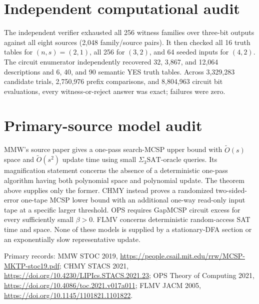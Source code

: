 \documentclass[11pt]{article}
\begin{document}
\section{Independent computational audit}
The independent verifier exhausted all 256 witness families over three-bit
outputs against all eight sources (2,048 family/source pairs).  It then checked
all 16 truth tables for $(n,s)=(2,1)$, all 256 for $(3,2)$, and 64 seeded inputs
for $(4,2)$.  The circuit enumerator independently recovered 32, 3,867, and
12,064 descriptions and 6, 40, and 90 semantic YES truth tables.  Across
3,329,283 candidate trials, 2,750,976 prefix comparisons, and 8,804,963 circuit
bit evaluations, every witness-or-reject answer was exact; failures were zero.

\section{Primary-source model audit}
MMW's source paper gives a one-pass search-MCSP upper bound with
$\widetilde O(s)$ space and $\widetilde O(s^2)$ update time using small
$\Sigma_3\mathrm{SAT}$-oracle queries.  Its magnification statement concerns
the absence of a deterministic one-pass algorithm having both polynomial
space and polynomial update.  The theorem above supplies only the former.
CHMY instead proves a randomized two-sided-error one-tape MCSP lower bound with
an additional one-way read-only input tape at a specific larger threshold.
OPS requires GapMCSP circuit excess for every sufficiently small $\beta>0$.
FLMV concerns deterministic random-access SAT time and space.  None of these
models is supplied by a stationary-DFA section or an exponentially slow
representative update.

Primary records: MMW STOC 2019,
\url{https://people.csail.mit.edu/rrw/MCSP-MKTP-stoc19.pdf}; CHMY STACS 2021,
\url{https://doi.org/10.4230/LIPIcs.STACS.2021.23}; OPS Theory of Computing
2021, \url{https://doi.org/10.4086/toc.2021.v017a011}; FLMV JACM 2005,
\url{https://doi.org/10.1145/1101821.1101822}.
\end{document}
